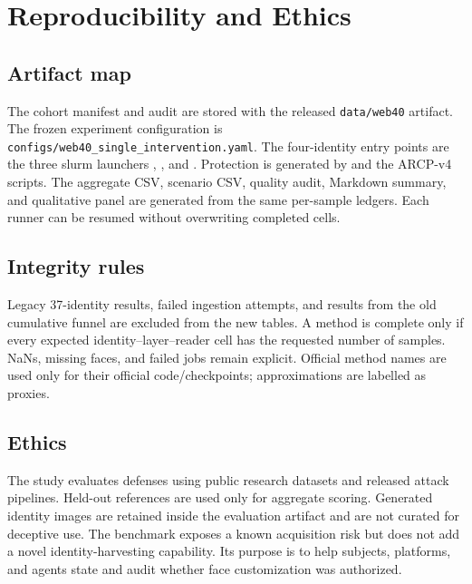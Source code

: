 \section{Reproducibility and Ethics}
\label{sec:appendix}

\subsection{Artifact map}
{\sloppy
The cohort manifest and audit are stored with the released \texttt{data/web40}
artifact. The frozen experiment configuration is
\texttt{configs/web40\_single\_intervention.yaml}. The four-identity entry
points are the three slurm launchers
,
, and
. Protection is generated by
 and the ARCP-v4 scripts.
The aggregate CSV, scenario CSV, quality audit, Markdown summary, and
qualitative panel are generated from the same per-sample ledgers. Each runner
can be resumed without overwriting completed cells.
\par}

\subsection{Integrity rules}
Legacy 37-identity results, failed ingestion attempts, and results from the old
cumulative funnel are excluded from the new tables. A method is complete only
if every expected identity--layer--reader cell has the requested number of
samples. NaNs, missing faces, and failed jobs remain explicit. Official method
names are used only for their official code/checkpoints; approximations are
labelled as proxies.

\subsection{Ethics}
The study evaluates defenses using public research datasets and released attack
pipelines. Held-out references are used only for aggregate scoring. Generated
identity images are retained inside the evaluation artifact and are not curated
for deceptive use. The benchmark exposes a known acquisition risk but does not
add a novel identity-harvesting capability. Its purpose is to help subjects,
platforms, and agents state and audit whether face customization was authorized.
